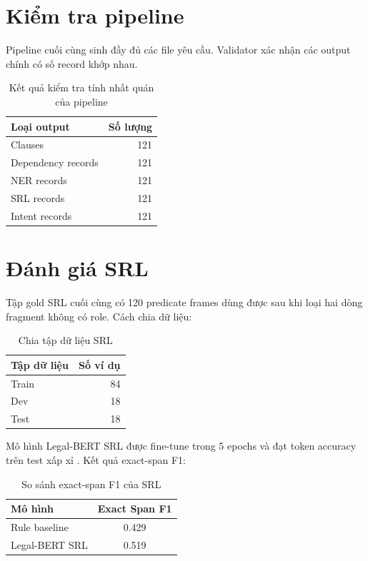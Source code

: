 \documentclass[oneside,final]{hcmut-report}
\newcommand{\result}[1]{\fbox{#1}}
\begin{document}
\section{Kiểm tra pipeline}
Pipeline cuối cùng sinh đầy đủ các file yêu cầu. Validator xác nhận các output chính có số record khớp nhau.

\begin{table}[H]
\centering
\begin{tabular}{l r}
\toprule
Loại output & Số lượng \\
\midrule
Clauses & 121 \\
Dependency records & 121 \\
NER records & 121 \\
SRL records & 121 \\
Intent records & 121 \\
\bottomrule
\end{tabular}
\caption{Kết quả kiểm tra tính nhất quán của pipeline}
\end{table}

\section{Đánh giá SRL}
Tập gold SRL cuối cùng có 120 predicate frames dùng được sau khi loại hai dòng fragment không có role. Cách chia dữ liệu:

\begin{table}[H]
\centering
\begin{tabular}{l r}
\toprule
Tập dữ liệu & Số ví dụ \\
\midrule
Train & 84 \\
Dev & 18 \\
Test & 18 \\
\bottomrule
\end{tabular}
\caption{Chia tập dữ liệu SRL}
\end{table}

Mô hình Legal-BERT SRL được fine-tune trong 5 epochs và đạt token accuracy trên test xấp xỉ \result{0.7818}. Kết quả exact-span F1:

\begin{table}[H]
\centering
\begin{tabular}{l c}
\toprule
Mô hình & Exact Span F1 \\
\midrule
Rule baseline & 0.429 \\
Legal-BERT SRL & 0.519 \\
\bottomrule
\end{tabular}
\caption{So sánh exact-span F1 của SRL}
\end{table}
\end{document}
